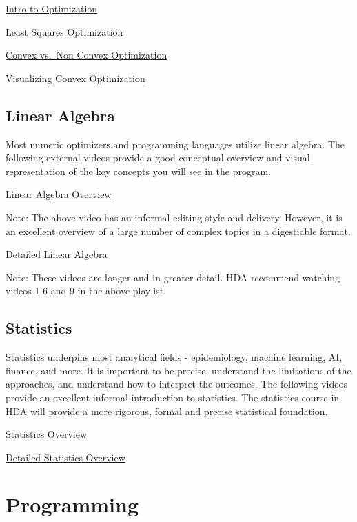 \documentclass[
]{book}
\begin{document}
\href{https://www.youtube.com/watch?v=YLzgYm2tN8E}{Intro to Optimization}

\href{https://www.youtube.com/watch?v=S0ptaAXNxBU}{Least Squares Optimization}

\href{https://www.youtube.com/watch?v=7QmGj1_i3MU}{Convex vs.~Non Convex Optimization}

\href{https://www.youtube.com/watch?v=AM6BY4btj-M}{Visualizing Convex Optimization}

\subsection{Linear Algebra}\label{linear-algebra}

Most numeric optimizers and programming languages utilize linear algebra. The following external videos provide a good conceptual overview and visual representation of the key concepts you will see in the program.

\href{https://www.youtube.com/watch?v=E8YQPBHLUrY}{Linear Algebra Overview}

Note: The above video has an informal editing style and delivery. However, it is an excellent overview of a large number of complex topics in a digestiable format.

\href{https://www.youtube.com/watch?v=fNk_zzaMoSs&list=PLZHQObOWTQDPD3MizzM2xVFitgF8hE_ab}{Detailed Linear Algebra}

Note: These videos are longer and in greater detail. HDA recommend watching videos 1-6 and 9 in the above playlist.

\subsection{Statistics}\label{statistics}

Statistics underpins most analytical fields - epidemiology, machine learning, AI, finance, and more. It is important to be precise, understand the limitations of the approaches, and understand how to interpret the outcomes. The following videos provide an excellent informal introduction to statistics. The statistics course in HDA will provide a more rigorous, formal and precise statistical foundation.

\href{https://www.youtube.com/watch?v=MXaJ7sa7q-8}{Statistics Overview}

\href{https://www.youtube.com/watch?v=Gi4GxE4obAc}{Detailed Statistics Overview}

\section{Programming}\label{programming}
\end{document}
